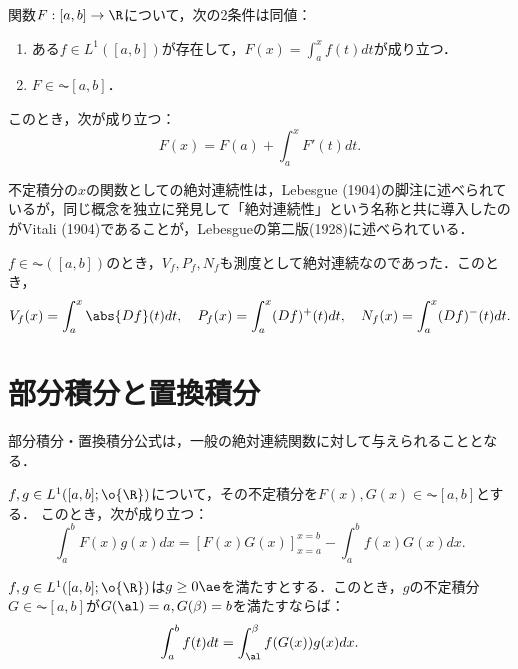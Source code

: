 \documentclass[uplatex, dvipdfmx]{jsreport}
\begin{document}
\begin{theorem}
    関数$F:[a,b]\to\R$について，次の2条件は同値：
    \begin{enumerate}
        \item ある$f\in L^1([a,b])$が存在して，$F(x)=\int^x_af(t)dt$が成り立つ．
        \item $F\in\AC[a,b]$．
    \end{enumerate}
    このとき，次が成り立つ：
    \[F(x)=F(a)+\int^x_aF'(t)dt.\]
\end{theorem}

\begin{history}
    不定積分の$x$の関数としての絶対連続性は，Lebesgue (1904)の脚注に述べられているが，同じ概念を独立に発見して「絶対連続性」という名称と共に導入したのがVitali (1904)であることが，Lebesgueの第二版(1928)に述べられている．
\end{history}

\begin{corollary}[変動の積分表現]
    $f\in\AC([a,b])$のとき，$V_f,P_f,N_f$も測度として絶対連続なのであった．このとき，
    \[V_f(x)=\int^x_a\abs{Df}(t)dt,\quad P_f(x)=\int^x_a(Df)^+(t)dt,\quad N_f(x)=\int^x_a(Df)^-(t)dt.\]
\end{corollary}

\section{部分積分と置換積分}

\begin{tcolorbox}[colframe=ForestGreen, colback=ForestGreen!10!white,breakable,colbacktitle=ForestGreen!40!white,coltitle=black,fonttitle=\bfseries\sffamily,
title=]
    部分積分・置換積分公式は，一般の絶対連続関数に対して与えられることとなる．
\end{tcolorbox}

\begin{theorem}[部分積分]
    $f,g\in L^1([a,b];\o{\R})$について，その不定積分を$F(x),G(x)\in\AC[a,b]$とする．
    このとき，次が成り立つ：
    \[\int^b_aF(x)g(x)dx=[F(x)G(x)]^{x=b}_{x=a}-\int^b_af(x)G(x)dx.\]
\end{theorem}

\begin{theorem}[置換積分]
    $f,g\in L^1([a,b];\o{\R})$は$g\ge0\ae$を満たすとする．このとき，$g$の不定積分$G\in\AC[a,b]$が$G(\al)=a,G(\beta)=b$を満たすならば：
    \[\int^b_af(t)dt=\int^\beta_\al f(G(x))g(x)dx.\]
\end{theorem}
\end{document}
